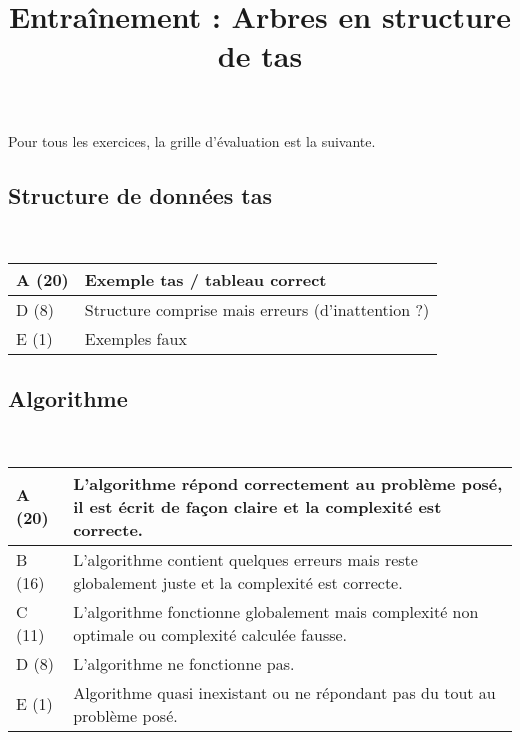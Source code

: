 \documentclass{../cours}
\title{Entraînement : Arbres en structure de tas}
\begin{document}
\maketitle

Pour tous les exercices, la grille d'évaluation est la suivante.

\subsection*{Structure de données tas}~

\begin{tabular}{|l|p{12cm}|}
\hline
A (20) & \small{Exemple tas / tableau correct} \\ \hline
D (8) & \small{Structure comprise mais erreurs (d’inattention ?)} \\ \hline
E (1) & \small{Exemples faux} \\ \hline
\end{tabular}

\subsection*{Algorithme}~

\begin{tabular}{|l|p{12cm}|}
\hline
A (20) & \small{L'algorithme répond correctement au problème posé, il est écrit de façon claire et la complexité est correcte.} \\ \hline
B (16) & \small{L'algorithme contient quelques erreurs mais reste globalement juste et la complexité est correcte.} \\ \hline
C (11) & \small{L'algorithme fonctionne globalement mais complexité non optimale ou complexité calculée fausse.} \\ \hline
D (8) & \small{L'algorithme ne fonctionne pas.} \\ \hline
E (1) & \small{Algorithme quasi inexistant ou ne répondant pas du tout au problème posé.} \\ \hline
\end{tabular}



\end{document}
